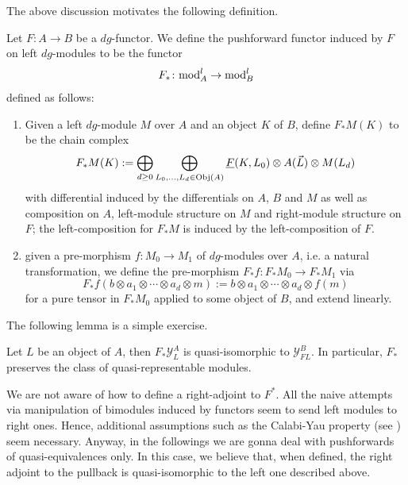 The above discussion motivates the following definition.
\begin{dfn}
    Let $F\colon A\to B$ be a $dg$-functor. We define the pushforward functor induced by $F$ on left $dg$-modules to be the functor $$F_*\colon \text{mod}^l_A\to \text{mod}^l_B$$ defined as follows:
    \begin{enumerate}
        \item Given a left $dg$-module $M$ over $A$ and an object $K$ of $B$, define $F_*M(K)$ to be the chain complex $$F_*M(K):= \bigoplus_{d\geq 0}\bigoplus_{L_0,\ldots,L_d\in \text{Obj}(A)}\underline{F}(K,L_0)\otimes A(\vec{L})\otimes M(L_d)$$ with differential induced by the differentials on $A$, $B$ and $M$ as well as composition on $A$, left-module structure on $M$ and right-module structure on $F$; the left-composition for $F_*M$ is induced by the left-composition of $F$.
        \item given a pre-morphism $f\colon M_0\to M_1$ of $dg$-modules over $A$, i.e. a natural transformation, we define the pre-morphism $F_*f\colon F_*M_0\to F_*M_1$ via $$F_*f(b\otimes a_1\otimes \cdots \otimes a_d\otimes m):= b\otimes a_1\otimes \cdots \otimes a_d\otimes f(m)$$ for a pure tensor in $F_*M_0$ applied to some object of $B$, and extend linearly.
    \end{enumerate}
\end{dfn}
The following lemma is a simple exercise.
\begin{lem}
    Let $L$ be an object of $A$, then $F_*\mathcal{Y}^A_L$ is quasi-isomorphic to $\mathcal{Y}^B_{FL}$. In particular, $F_*$ preserves the class of quasi-representable modules.
\end{lem}
\begin{remark}
    We are not aware of how to define a right-adjoint to $F^*$. All the naive attempts via manipulation of bimodules induced by functors seem to send left modules to right ones. Hence, additional assumptions such as the Calabi-Yau property (see \cite{Gan:thesis}) seem necessary. Anyway, in the followings we are gonna deal with pushforwards of quasi-equivalences only. In this case, we believe that, when defined, the right adjoint to the pullback is quasi-isomorphic to the left one described above. 
\end{remark}






